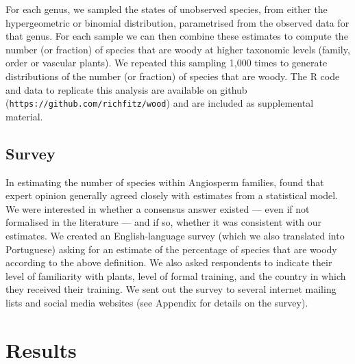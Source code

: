 \documentclass[a4paper,12pt]{article}
\begin{document}
For each genus, we sampled the states of unobserved species, from
either the hypergeometric or binomial distribution, parametrised from
the observed data for that genus.
%
For each sample we can then combine these estimates to compute the
number (or fraction) of species that are woody at higher taxonomic
levels (family, order or vascular plants).  We repeated this sampling
1,000 times to generate distributions of the number (or fraction) of
species that are woody.
%
The R code and data to replicate this analysis are available on github
(\texttt{https://github.com/richfitz/wood}) and are included
as supplemental material.

\subsection{Survey}

In estimating the number of species within Angiosperm families,
\citet{joppa2010} found that expert opinion generally agreed closely
with estimates from a statistical model.  We were interested in
whether a consensus answer existed --- even if not formalised in the
literature --- and if so, whether it was consistent with our
estimates.
% 
We created an English-language survey (which we also translated into
Portuguese) asking for an estimate of the percentage of species that
are woody according to the above definition.  We also asked
respondents to indicate their level of familiarity with plants, level
of formal training, and the country in which they received their
training. We sent out the survey to several internet mailing lists and
social media websites (see Appendix for details on the
survey).

\section{Results}
\end{document}
